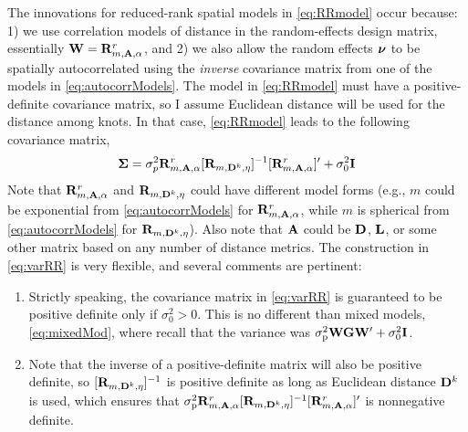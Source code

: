\documentclass[11pt, titlepage]{article}\usepackage[]{graphicx}\usepackage[]{color}
\begin{document}
\begin{spacing}{1.9}
\begin{flushleft}
The innovations for reduced-rank spatial models in \ref{eq:RRmodel} occur because: 1) we use correlation models of distance in the random-effects design matrix, essentially $\mathbf{W} = \mathbf{R}^r_{m,\mathbf{A},\alpha}$, and 2) we also allow the random effects $\mbox{\boldmath $\nu$}$ to be spatially autocorrelated using the \emph{inverse} covariance matrix from one of the models in \ref{eq:autocorrModels}.  The model in \ref{eq:RRmodel} must have a positive-definite covariance matrix, so I assume Euclidean distance will be used for the distance among knots.  In that case, \ref{eq:RRmodel} leads to the following covariance matrix,
\begin{equation} \label{eq:varRR}
				\mbox{\boldmath $\Sigma$} = \sigma^2_p\mathbf{R}^r_{m,\mathbf{A},\alpha}[\mathbf{R}_{m,\mathbf{D}^k,\eta}]^{-1}[\mathbf{R}^r_{m,\mathbf{A},\alpha}]^{\prime} + \sigma^2_0\mathbf{I}
\end{equation}
Note that $\mathbf{R}^r_{m,\mathbf{A},\alpha}$ and $\mathbf{R}_{m,\mathbf{D}^k,\eta}$ could have different model forms (e.g., $m$ could be exponential from \ref{eq:autocorrModels} for $\mathbf{R}^r_{m,\mathbf{A},\alpha}$, while $m$ is spherical from \ref{eq:autocorrModels} for $\mathbf{R}_{m,\mathbf{D}^k,\eta}$). Also note that $\mathbf{A}$ could be $\mathbf{D}$, $\mathbf{L}$, or some other matrix based on any number of distance metrics.  The construction in \ref{eq:varRR} is very flexible, and several comments are pertinent:
\begin{enumerate}
		\item Strictly speaking, the covariance matrix in \ref{eq:varRR} is guaranteed to be positive definite only if $\sigma_0^2 > 0$. This is no different than mixed models, \ref{eq:mixedMod}, where recall that the variance was $\sigma^2_\textrm{p}\mathbf{W}\mathbf{G}\mathbf{W}^{\prime} + \sigma_0^2\mathbf{I}$.  
		\item Note that the inverse of a positive-definite matrix will also be positive definite, so $[\mathbf{R}_{m,\mathbf{D}^k,\eta}]^{-1}$ is positive definite as long as Euclidean distance $\mathbf{D}^k$ is used, which ensures that $\sigma^2_\textrm{p}\mathbf{R}^r_{m,\mathbf{A},\alpha}[\mathbf{R}_{m,\mathbf{D}^k,\eta}]^{-1}[\mathbf{R}^r_{m,\mathbf{A},\alpha}]^{\prime}$ is nonnegative definite.

\end{enumerate}
\end{flushleft}
\end{spacing}
\end{document}
